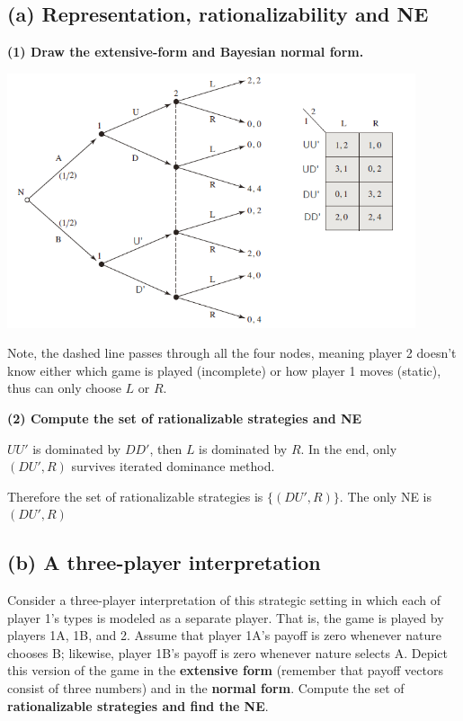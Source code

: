 \documentclass{article}
\begin{document}
\subsection*{(a) Representation, rationalizability and NE} 

\textbf{(1) Draw the extensive-form and Bayesian normal form. }

\begin{center}
\includegraphics[width=0.9\textwidth]{9.q26_3_a}
\end{center}
\vspace{2mm}


\begin{mdframed}[backgroundcolor=blue!20,linecolor=white]
Note, the dashed line passes through all the four nodes, meaning player 2 doesn't know either which game is played (incomplete) or how player 1 moves (static), thus can only choose $L$ or $R$.
\end{mdframed}


\textbf{(2) Compute the set of rationalizable strategies and NE}
\vspace{2mm}

$UU'$ is dominated by $DD'$, then $L$ is dominated by $R$. In the end, only $(DU',R)$ survives iterated dominance method. 
\vspace{2mm}

Therefore the set of rationalizable strategies is $\{(DU',R)\}$. The only NE is $(DU',R)$

\subsection*{(b) A three-player interpretation } 

Consider a three-player interpretation of this strategic setting in which each of player 1's types is modeled as a separate player. That is, the
game is played by players 1A, 1B, and 2. Assume that player 1A's
payoff is zero whenever nature chooses B; likewise, player 1B's payoff
is zero whenever nature selects A. Depict this version of the game in the
\textbf{extensive form} (remember that payoff vectors consist of three numbers)
and in the \textbf{normal form}. Compute the set of \textbf{rationalizable strategies and
find the NE}.
\end{document}
